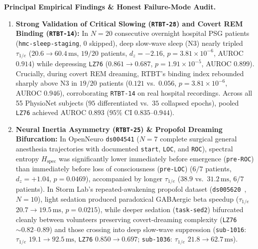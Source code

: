 \documentclass[11pt,letterpaper]{article}
\newcommand{\code}[1]{\texttt{\small #1}}
\begin{document}
\textbf{Principal Empirical Findings \& Honest Failure-Mode Audit.}
\begin{enumerate}
  \item \textbf{Strong Validation of Critical Slowing (\code{RTBT-28}) and Covert REM Binding (\code{RTBT-14}):} In $N=20$ consecutive overnight hospital PSG patients (\code{hmc-sleep-staging}, $0$ skipped), deep slow-wave sleep (N3) nearly tripled $\tau_{1/e}$ ($20.6 \to 60.4\,\mathrm{ms}$, $19/20$ patients, $d_z=-2.16$, $p=3.81\times 10^{-6}$, AUROC $0.914$) while depressing \code{LZ76} ($0.861 \to 0.687$, $p=1.91\times 10^{-5}$, AUROC $0.899$). Crucially, during covert REM dreaming, RTBT's binding index rebounded sharply above N3 in $19/20$ patients ($0.121$ vs.\ $0.056$, $p=3.81\times 10^{-6}$, AUROC $0.946$), corroborating \code{RTBT-14} on real hospital recordings. Across all 55 PhysioNet subjects ($95$ differentiated vs.\ $35$ collapsed epochs), pooled \code{LZ76} achieved AUROC $0.893$ ($95\%$ CI $0.835$--$0.944$).
  \item \textbf{Neural Inertia Asymmetry (\code{RTBT-25}) \& Propofol Dreaming Bifurcation:} In OpenNeuro \code{ds004541} ($N=7$ complete surgical general anesthesia trajectories with documented \code{start}, \code{LOC}, and \code{ROC}), spectral entropy $H_{\mathrm{spec}}$ was significantly lower immediately before emergence (\code{pre-ROC}) than immediately before loss of consciousness (\code{pre-LOC}) ($6/7$ patients, $d_z=+1.04$, $p=0.0469$), accompanied by longer $\tau_{1/e}$ ($38.9$ vs.\ $31.2\,\mathrm{ms}$, $6/7$ patients). In Storm Lab's repeated-awakening propofol dataset (\code{ds005620}~\cite{Bajwa2024}, $N=10$), light sedation produced paradoxical GABAergic beta speedup ($\tau_{1/e}$ $20.7 \to 19.5\,\mathrm{ms}$, $p=0.0215$), while deeper sedation (\code{task-sed2}) bifurcated cleanly between volunteers preserving covert-dreaming complexity (\code{LZ76} $\sim 0.82$--$0.89$) and those crossing into deep slow-wave suppression (\code{sub-1016}: $\tau_{1/e}$ $19.1 \to 92.5\,\mathrm{ms}$, \code{LZ76} $0.850 \to 0.697$; \code{sub-1036}: $\tau_{1/e}$ $21.8 \to 62.7\,\mathrm{ms}$).

\end{enumerate}
\end{document}
